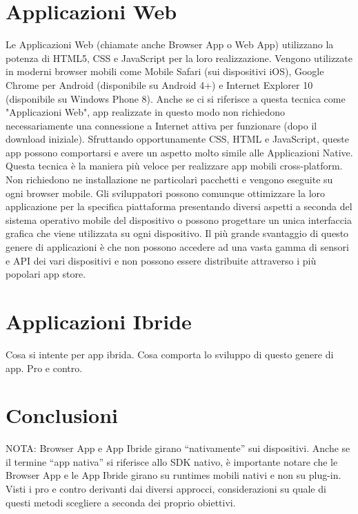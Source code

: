 	\section{Applicazioni Web}
		Le Applicazioni Web (chiamate anche Browser App o Web App) utilizzano la potenza di HTML5, CSS e JavaScript per la loro realizzazione. Vengono utilizzate in moderni browser mobili come Mobile Safari (sui dispositivi iOS), Google Chrome per Android (disponibile su Android 4+) e Internet Explorer 10 (disponibile su Windows Phone 8).
Anche se ci si riferisce a questa tecnica come "Applicazioni Web", app realizzate in questo modo non richiedono necessariamente una connessione a Internet attiva per funzionare (dopo il download iniziale). Sfruttando opportunamente CSS, HTML e JavaScript, queste app possono comportarsi e avere un aspetto molto simile alle Applicazioni Native.
Questa tecnica è la maniera più veloce per realizzare app mobili cross-platform. Non richiedono ne installazione ne particolari pacchetti e vengono eseguite su ogni browser mobile. Gli sviluppatori possono comunque ottimizzare la loro applicazione per la specifica piattaforma presentando diversi aspetti a seconda del sistema operativo mobile del dispositivo o possono progettare un unica interfaccia grafica che viene utilizzata su ogni dispositivo.
Il più grande svantaggio di questo genere di applicazioni è che non possono accedere ad una vasta gamma di sensori e API dei vari dispositivi e non possono essere distribuite attraverso i più popolari app store.
		
	\section{Applicazioni Ibride}
		Cosa si intente per app ibrida. Cosa comporta lo sviluppo di questo
		genere di app. Pro e contro.
		
	\section{Conclusioni}
	NOTA: Browser App e App Ibride girano “nativamente” sui dispositivi. Anche se il termine “app nativa” si riferisce allo SDK nativo, è importante notare che le Browser App e le App Ibride girano su runtimes mobili nativi e non su plug-in.
		Visti i pro e contro derivanti dai diversi approcci, considerazioni su
		quale di questi metodi scegliere a seconda dei proprio obiettivi.
		
	
		
	